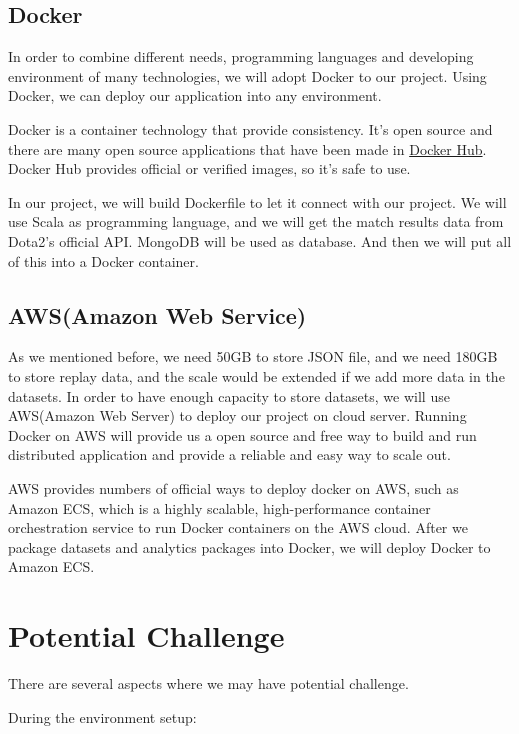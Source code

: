 \documentclass{article}
\begin{document}
\subsection{Docker}
    
In order to combine different needs, programming languages and developing environment of many technologies, we will adopt Docker to our project. Using Docker, we can deploy our application into any environment.

Docker is a container technology that provide consistency. It's open source and there are many open source applications that have been made in \href{https://hub.docker.com}{Docker Hub}. Docker Hub provides official or verified images, so it's safe to use.

In our project, we will build Dockerfile to let it connect with our project. We will use Scala as programming language, and we will get the match results data from Dota2’s official API. MongoDB will be used as database. And then we will put all of this into a Docker container.
    
\subsection{AWS(Amazon Web Service)}
    
As we mentioned before, we need 50GB to store JSON file, and we need 180GB to store replay data, and the scale would be extended if we add more data in the datasets. In order to have enough capacity to store datasets, we will use AWS(Amazon Web Server) to deploy our project on cloud server. Running Docker on AWS will provide us a open source and free way to build and run distributed application and provide a reliable and easy way to scale out.

AWS provides numbers of official ways to deploy docker on AWS, such as Amazon ECS, which is a highly scalable, high-performance container orchestration service to run Docker containers on the AWS cloud. After we package datasets and analytics packages into Docker, we will deploy Docker to Amazon ECS.
    

\section{Potential Challenge}

There are several aspects where we may have potential challenge.

During the environment setup:
\end{document}
